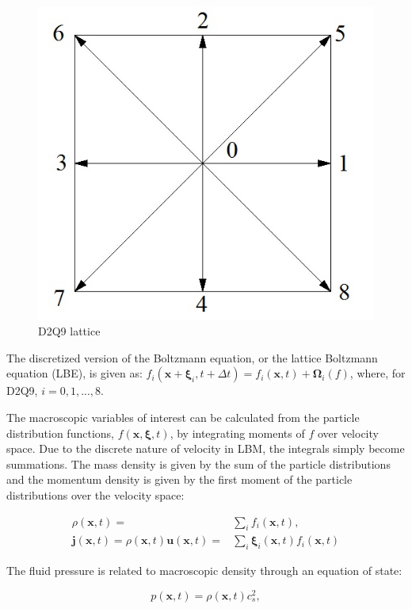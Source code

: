 \documentclass{article}
\newcommand{\pos}{\mathbf{x}}
\newcommand{\pvel}{\boldsymbol{\xi}}
\newcommand{\mvel}{\mathbf{u}}
\newcommand{\cop}{\boldsymbol{\Omega}}
\newcommand{\mmom}{\mathbf{j}}
\begin{document}
\begin{figure}
  \includegraphics[]{figs/d2q9}
  \caption{D2Q9 lattice}
  \label{fig:d2q9}
\end{figure}

The discretized version of the Boltzmann equation, or the lattice Boltzmann equation (LBE), is given as: $f_i(\pos + \pvel_i, t + \Delta t) = f_i(\pos, t) + \cop_i(f)$, where, for D2Q9, $i = 0, 1, ..., 8$.

The macroscopic variables of interest can be calculated from the particle distribution functions, $f(\pos, \pvel, t)$, by integrating moments of $f$ over velocity space.
Due to the discrete nature of velocity in LBM, the integrals simply become summations.
The mass density is given by the sum of the particle distributions and the momentum density is given by the first moment of the particle distributions over the velocity space:

\begin{align}
\label{eq:rho} \rho(\pos, t) =& \sum_{i} f_i(\pos, t), \\
\label{eq:mom} \mmom(\pos, t) = \rho(\pos, t) \mvel(\pos, t) =& \sum_{i} \pvel_i(\pos, t) f_i(\pos, t)
\end{align}

The fluid pressure is related to macroscopic density through an equation of state:

\begin{equation}
\label{eq:pres} p(\pos, t) = \rho(\pos, t) c_s^2,
\end{equation}
\end{document}
